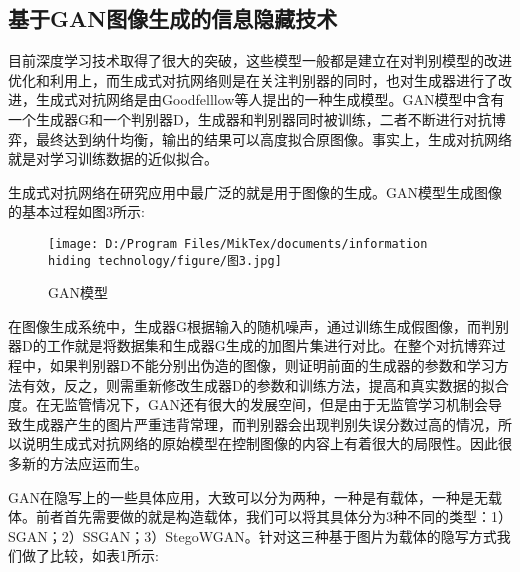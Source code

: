     \subsection{基于GAN图像生成的信息隐藏技术}
    目前深度学习技术取得了很大的突破，这些模型一般都是建立在对判别模型的改进优化和利用上\cite{ref4}，而生成式对抗网络则是在关注判别器的同时，也对生成器进行了改进，生成式对抗网络\cite{ref5}是由Goodfelllow等人提出的一种生成模型。GAN模型\cite{ref6}中含有一个生成器G和一个判别器D，生成器和判别器同时被训练，二者不断进行对抗博弈，最终达到纳什均衡，输出的结果可以高度拟合原图像。事实上，生成对抗网络就是对学习训练数据的近似拟合。
    \par 生成式对抗网络在研究应用中最广泛的就是用于图像的生成\cite{ref7}。GAN模型生成图像的基本过程如图3所示:
    \begin{figure}[!ht]\centering   %
    \texttt{[image: D:/Program Files/MikTex/documents/information hiding technology/figure/图3.jpg]}%
    \caption{GAN模型}
    \end{figure}
    \par\noindent 在图像生成系统中，生成器G根据输入的随机噪声，通过训练生成假图像，而判别器D的工作就是将数据集和生成器G生成的加图片集进行对比。在整个对抗博弈过程中，如果判别器D不能分别出伪造的图像，则证明前面的生成器的参数和学习方法有效，反之，则需重新修改生成器D的参数和训练方法，提高和真实数据的拟合度。在无监管情况下，GAN还有很大的发展空间，但是由于无监管学习机制会导致生成器产生的图片严重违背常理，而判别器会出现判别失误分数过高的情况，所以说明生成式对抗网络的原始模型在控制图像的内容上有着很大的局限性。因此很多新的方法应运而生。
    \par GAN在隐写上的一些具体应用\cite{ref8}，大致可以分为两种，一种是有载体，一种是无载体。前者首先需要做的就是构造载体，我们可以将其具体分为3种不同的类型：1）SGAN；2）SSGAN；3）StegoWGAN。针对这三种基于图片为载体的隐写方式我们做了比较，如表1所示:
